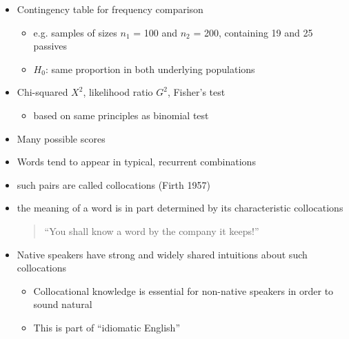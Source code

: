 \documentclass[a4paper,landscape,headrule,footrule,dvips]{foils}
\begin{document}
\begin{CJK}{UTF8}{min}
\begin{itemize}
\item Contingency table for frequency comparison
\begin{itemize}
\item e.g. samples of sizes $n_1$ = 100 and $n_2$ = 200,
containing 19 and 25 passives
\item $H_0$: same proportion in both underlying populations
\end{itemize}
\item Chi-squared $X^2$, likelihood ratio $G^2$, Fisher's test
  \begin{itemize}
  \item based on same principles as binomial test
  \end{itemize}
\item Many possible scores
\end{itemize}




\begin{itemize}
\item Words tend to appear in typical, recurrent combinations
\item such pairs are called collocations (Firth 1957)
\item the meaning of a word is in part determined by its
characteristic collocations
\begin{quote}
``You shall know a word by the company it keeps!''
\end{quote}
\item Native speakers have strong and widely shared intuitions
about such collocations
\begin{itemize}
\item Collocational knowledge is essential for non-native
speakers in order to sound natural
\item This is part of ``idiomatic English''
\end{itemize}
\end{itemize}



\end{CJK}
\end{document}
